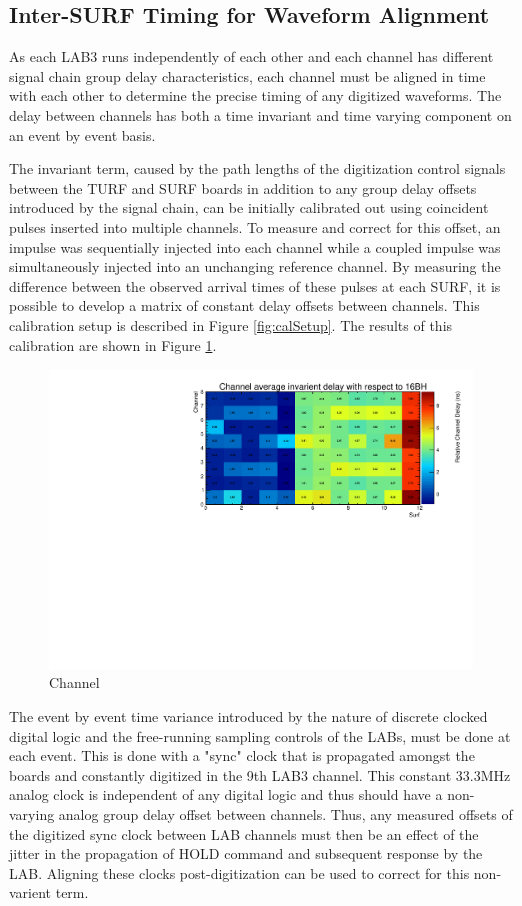 		
	\subsection{Inter-SURF Timing for Waveform Alignment}	
		As each LAB3 runs independently of each other and each channel has different signal chain group delay characteristics, each channel must be aligned in time with each other to determine the precise timing of any digitized waveforms.  The delay between channels has both a time invariant and time varying component on an event by event basis.  
		
		The invariant term, caused by the path lengths of the digitization control signals between the TURF and SURF boards in addition to any group delay offsets introduced by the signal chain, can be initially calibrated out using coincident pulses inserted into multiple channels.  To measure and correct for this offset, an impulse was sequentially injected into each channel while a coupled impulse was simultaneously injected into an unchanging reference channel.  By measuring the difference between the observed arrival times of these pulses at each SURF, it is possible to develop a matrix of constant delay offsets between channels.  This calibration setup is described in Figure \ref{fig:calSetup}.  The results of this calibration are shown in Figure \ref{fig:delayOffsets}.
		

	\begin{figure}
		\includegraphics[width=\textwidth]{figures/averagedCableDelay}
		\caption{Channel}
		\label{fig:delayOffsets}
	\end{figure}
		
		
		The event by event time variance introduced by the nature of discrete clocked digital logic and the free-running sampling controls of the LABs, must be done at each event.  This is done with a "sync" clock that is propagated amongst the boards and constantly digitized in the 9th LAB3 channel.  This constant  33.3MHz analog clock is independent of any digital logic and thus should have a non-varying analog group delay offset between channels.  Thus, any measured offsets of the digitized sync clock between LAB channels must then be an effect of the jitter in the propagation of HOLD command and subsequent response by the LAB.  Aligning these clocks post-digitization can be used to correct for this non-varient term.
		



